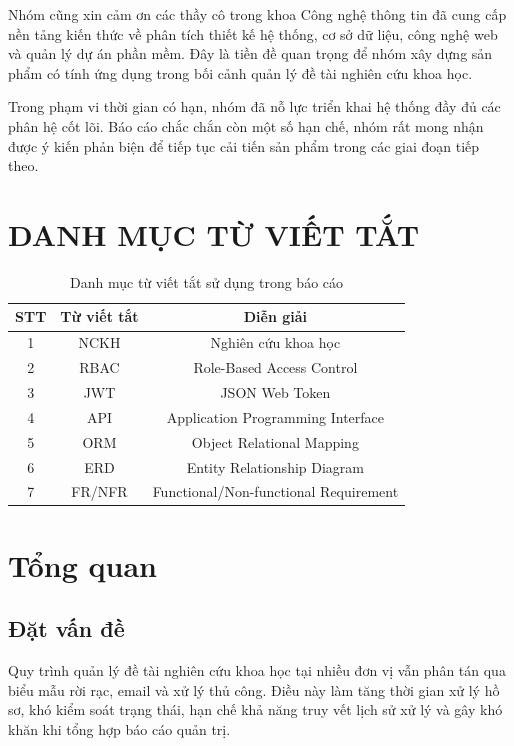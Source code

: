 \documentclass[12pt,a4paper]{report}
\begin{document}
Nhóm cũng xin cảm ơn các thầy cô trong khoa Công nghệ thông tin đã cung cấp nền tảng kiến thức về phân tích thiết kế hệ thống, cơ sở dữ liệu, công nghệ web và quản lý dự án phần mềm. Đây là tiền đề quan trọng để nhóm xây dựng sản phẩm có tính ứng dụng trong bối cảnh quản lý đề tài nghiên cứu khoa học.

Trong phạm vi thời gian có hạn, nhóm đã nỗ lực triển khai hệ thống đầy đủ các phân hệ cốt lõi. Báo cáo chắc chắn còn một số hạn chế, nhóm rất mong nhận được ý kiến phản biện để tiếp tục cải tiến sản phẩm trong các giai đoạn tiếp theo.

\tableofcontents
\listoftables
\listoffigures
\newpage

\chapter*{DANH MỤC TỪ VIẾT TẮT}
\begin{table}[H]
\centering
\begin{tabular}{|c|c|c|}
\hline
\textbf{STT} & \textbf{Từ viết tắt} & \textbf{Diễn giải} \\ \hline
1 & NCKH & Nghiên cứu khoa học \\ \hline
2 & RBAC & Role-Based Access Control \\ \hline
3 & JWT & JSON Web Token \\ \hline
4 & API & Application Programming Interface \\ \hline
5 & ORM & Object Relational Mapping \\ \hline
6 & ERD & Entity Relationship Diagram \\ \hline
7 & FR/NFR & Functional/Non-functional Requirement \\ \hline
\end{tabular}
\caption{Danh mục từ viết tắt sử dụng trong báo cáo}
\end{table}

\chapter{Tổng quan}
\section{Đặt vấn đề}
Quy trình quản lý đề tài nghiên cứu khoa học tại nhiều đơn vị vẫn phân tán qua biểu mẫu rời rạc, email và xử lý thủ công. Điều này làm tăng thời gian xử lý hồ sơ, khó kiểm soát trạng thái, hạn chế khả năng truy vết lịch sử xử lý và gây khó khăn khi tổng hợp báo cáo quản trị.
\end{document}
